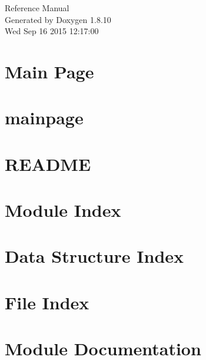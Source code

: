 \documentclass[twoside]{book}
\newcommand{\+}{\discretionary{\mbox{\scriptsize$\hookleftarrow$}}{}{}}
\newcommand{\clearemptydoublepage}{%
  \newpage{\pagestyle{empty}\cleardoublepage}%
}
\begin{document}
\hypersetup{pageanchor=false,
             bookmarks=true,
             bookmarksnumbered=true,
             pdfencoding=unicode
            }
\begin{titlepage}
\vspace*{7cm}
\begin{center}%
{\Large Reference Manual}\\
\vspace*{1cm}
{\large Generated by Doxygen 1.8.10}\\
\vspace*{0.5cm}
{\small Wed Sep 16 2015 12:17:00}\\
\end{center}
\end{titlepage}
\clearemptydoublepage
\tableofcontents
\clearemptydoublepage
{}
\hypersetup{pageanchor=true}

\chapter{Main Page}
\label{index}\hypertarget{index}{}
\chapter{mainpage}
\label{md_docs_mainpage}
\hypertarget{md_docs_mainpage}{}

\chapter{R\+E\+A\+D\+M\+E}
\label{md__r_e_a_d_m_e}
\hypertarget{md__r_e_a_d_m_e}{}

\chapter{Module Index}

\chapter{Data Structure Index}

\chapter{File Index}

\chapter{Module Documentation}



\end{document}
